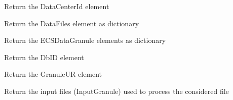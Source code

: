 \documentclass[a4paper,11pt,oneside]{sphinxmanual}
\begin{document}
\begin{fulllineitems}
\begin{fulllineitems}
\end{fulllineitems}


\begin{fulllineitems}
\label{pymodis/pymodis:pymodis.parsemodis.parseModis.retDataCenter}
Return the DataCenterId element

\end{fulllineitems}


\begin{fulllineitems}
\label{pymodis/pymodis:pymodis.parsemodis.parseModis.retDataFiles}
Return the DataFiles element as dictionary

\end{fulllineitems}


\begin{fulllineitems}
\label{pymodis/pymodis:pymodis.parsemodis.parseModis.retDataGranule}
Return the ECSDataGranule elements as dictionary

\end{fulllineitems}


\begin{fulllineitems}
\label{pymodis/pymodis:pymodis.parsemodis.parseModis.retDbID}
Return the DbID element

\end{fulllineitems}


\begin{fulllineitems}
\label{pymodis/pymodis:pymodis.parsemodis.parseModis.retGranuleUR}
Return the GranuleUR element

\end{fulllineitems}


\begin{fulllineitems}
\label{pymodis/pymodis:pymodis.parsemodis.parseModis.retInputGranule}
Return the input files (InputGranule) used to process the considered
file


\end{fulllineitems}
\end{fulllineitems}
\end{document}
